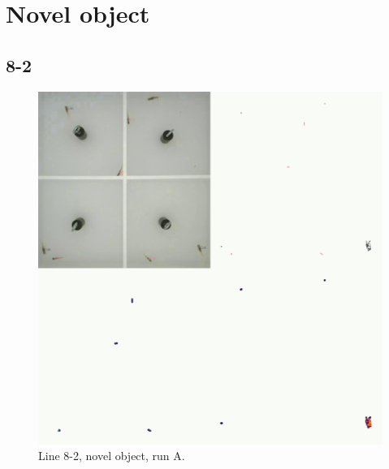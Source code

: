 \documentclass[
]{book}
\begin{document}
\hypertarget{novel-object}{%
\section{Novel object}\label{novel-object}}

\hypertarget{section-6}{%
\subsection{8-2}\label{section-6}}



\begin{figure}
\includegraphics[width=1\linewidth]{figs/mikk_behaviour/four_panel_plots/novel_object_20191114_1040_8-2_L_A_300} \caption{Line 8-2, novel object, run A.}\label{fig:4p-8-2-no-A}
\end{figure}
\end{document}
